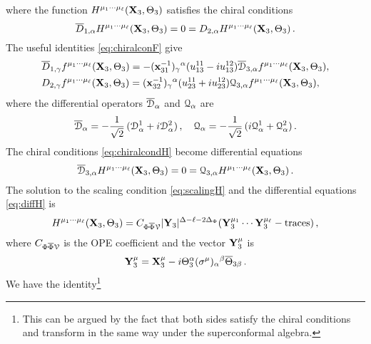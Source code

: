 \documentclass[11pt]{article}
\begin{document}
%
where the function $H^{\mu_1\cdots\mu_\ell}({\bf X}_3,\Theta_3)$ satisfies the chiral conditions
%
\begin{equation}\label{eq:chiralcondH}
\overline D_{1,\alpha}H^{\mu_1\cdots\mu_\ell}({\bf X}_3,\Theta_3)=0= D_{2,\alpha}H^{\mu_1\cdots\mu_\ell}({\bf X}_3,\Theta_3)\,.
\end{equation}
%
The useful identities \eqref{eq:chiralconF} give
%
\begin{equation}
\begin{split}
&\overline D_{1,\gamma} f^{\mu_1\cdots\mu_\ell}({\bf X}_3,\Theta_3)=-({\bf x}_{31}^{-1})_\gamma{}^\alpha (u_{13}^{11}-iu_{13}^{12})\overline {\cal D}_{3,\alpha} f^{\mu_1\cdots\mu_\ell}({\bf X}_3,\Theta_3),
\\
&D_{2,\gamma} f^{\mu_1\cdots\mu_\ell}({\bf X}_3,\Theta_3)=({\bf x}_{32}^{-1})_\gamma{}^\alpha (u_{23}^{11}+iu_{23}^{12}){\cal Q}_{3,\alpha} f^{\mu_1\cdots\mu_\ell}({\bf X}_3,\Theta_3),
\end{split}
\end{equation}
%
where the differential operators $\overline{\cal D}_\alpha$ and ${\cal Q}_\alpha$ are
%
\begin{equation}
\overline {\cal D}_\alpha = - \frac{1}{\sqrt{2}}\, ({\cal D}^1_\alpha+i{\cal D}^2_\alpha)\,,\quad{\cal Q}_\alpha=- \frac{1}{\sqrt{2}}\, (i {\cal Q}^1_\alpha+{\cal Q}^2_\alpha)\,.
\end{equation}
%
The chiral conditions \eqref{eq:chiralcondH} become differential equations
%
\begin{equation}\label{eq:diffH}
\overline {\cal D}_{3,\alpha}H^{\mu_1\cdots\mu_\ell}({\bf X}_3,\Theta_3)=0= {\cal Q}_{3,\alpha}H^{\mu_1\cdots\mu_\ell}({\bf X}_3,\Theta_3)\,.
\end{equation}
%
The solution to the scaling condition \eqref{eq:scalingH} and the differential equations \eqref{eq:diffH} is
%
\begin{equation}
H^{\mu_1\cdots\mu_\ell}({\bf X}_3,\Theta_3)=C_{\Phi\overline\Phi {\cal V}} |{\bf Y}_3|^{\Delta-\ell-2\Delta_\Phi}({\bf Y}_3^{\mu_1}\cdots{\bf Y}_3^{\mu_\ell}-{\rm traces})\,,
\end{equation}
%
where $C_{\Phi\overline\Phi {\cal V}}$ is the OPE coefficient and the vector ${\bf Y}^\mu_3$ is
%
\begin{equation}
{\bf Y}^\mu_3={\bf X}^\mu_3-i\Theta_3^\alpha (\sigma^\mu)_\alpha{}^\beta\overline\Theta_{3\beta}\,.
\end{equation}
%
We have the identity\footnote{This can be argued by the fact that both sides satisfy the chiral conditions and transform in the same way under the superconformal algebra.}
\end{document}
